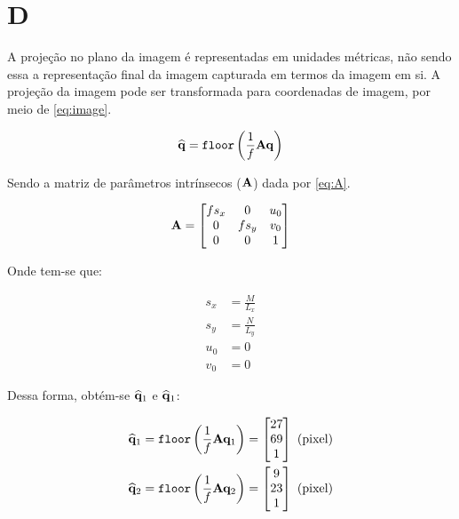 \section{D}

A projeção no plano da imagem é representadas em unidades métricas, não sendo essa a representação final da imagem capturada em termos da imagem em si. A projeção da imagem pode ser transformada para coordenadas de imagem, por meio de \eqref{eq:image}.

\begin{equation}\label{eq:image}
	\widehat{\mathbf{q}} = \texttt{floor}\left(\frac{1}{f}\mathbf{A}\mathbf{q}\right)
\end{equation}

Sendo a matriz de parâmetros intrínsecos ($\mathbf{A}$) dada por \eqref{eq:A}.

\begin{equation}\label{eq:A}
	\mathbf{A} = \begin{bmatrix}
		fs_x & 0 & u_0 \\
		0 & fs_y & v_0\\
		0 & 0 & 1
	\end{bmatrix}
\end{equation}

Onde tem-se que:

\begin{align}
	s_x &= \frac{M}{L_x} \\
	s_y &= \frac{N}{L_y} \\
	u_0 &= 0 \\
	v_0 &= 0 
\end{align}

Dessa forma, obtém-se $\widehat{\mathbf{q}}_1$ e $\widehat{\mathbf{q}}_1$:

\begin{align}
	\widehat{\mathbf{q}}_1 &= \texttt{floor}\left(\frac{1}{f}\mathbf{A}\mathbf{q}_1\right) = \begin{bmatrix}
		27\\
		69\\
		1
	\end{bmatrix}  \text{ (pixel)}\\
	\widehat{\mathbf{q}}_2 &= \texttt{floor}\left(\frac{1}{f}\mathbf{A}\mathbf{q}_2\right)  = \begin{bmatrix}
		9\\
		23\\
		1
	\end{bmatrix}  \text{ (pixel)}
\end{align}


